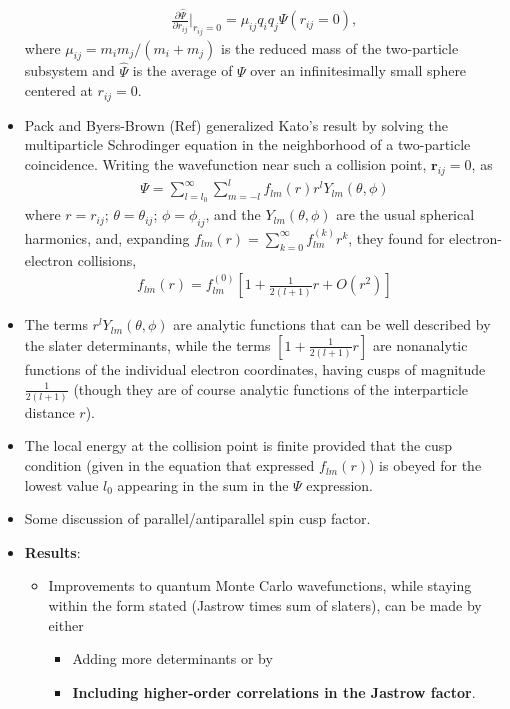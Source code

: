\documentclass[twoside,english]{uiofysmaster}
\begin{document}
\begin{itemize}
	\begin{align}
		\frac{ \partial \hat{\Psi} }{ \partial r_{ij} } |_{r_{ij}=0} = \mu_{ij} q_i q_j \Psi (r_{ij} = 0),
	\end{align}
	where $\mu_{ij} = m_i m_j/(m_i + m_j)$ is the reduced mass of the two-particle subsystem and $\hat{\Psi}$ is the average of $\Psi$ over an infinitesimally small sphere centered at $r_{ij} = 0$. 
	\item Pack and Byers-Brown (Ref) generalized Kato's result by solving the multiparticle Schrodinger equation in the neighborhood of a two-particle coincidence. Writing the wavefunction near such a collision point, $\bm{r}_{ij}=0$, as
	\begin{align}
		\Psi = \sum_{l=l_0}^\infty \sum_{m=-l}^l f_{lm} (r) r^l Y_{lm} (\theta, \phi)
	\end{align}
	where $r=r_{ij}$; $\theta=\theta_{ij}$; $\phi=\phi_{ij}$, and the $Y_{lm} (\theta, \phi)$ are the usual spherical harmonics, and, expanding $f_{lm}(r) = \sum_{k=0}^\infty f_{lm}^{(k)} r^k$, they found for electron-electron collisions,
	\begin{align}
		f_{lm} (r) = f_{lm}^{(0)} [ 1 + \frac{1}{2(l+1)}r + O(r^2) ]
	\end{align}
	\item The terms $r^l Y_{lm} (\theta, \phi)$ are analytic functions that can be well described by the slater determinants, while the terms $ [ 1 + \frac{1}{2(l+1)}r ]$ are nonanalytic functions of the individual electron coordinates, having cusps of magnitude $\frac{1}{2(l+1)}$ (though they are of course analytic functions of the interparticle distance $r$). 
	\item The local energy at the collision point is finite provided that the cusp condition (given in the equation that expressed $f_{lm}(r)$) is obeyed for the lowest value $l_0$ appearing in the sum in the $\Psi$ expression.
	\item Some discussion of parallel/antiparallel spin cusp factor.
	\item \textbf{Results}:
	\begin{itemize}
		\item Improvements to quantum Monte Carlo wavefunctions, while staying within the form stated (Jastrow times sum of slaters), can be made by either
		\begin{itemize}
			\item Adding more determinants or by
			\item \textbf{Including higher-order correlations in the Jastrow factor}.

\end{itemize}
\end{itemize}
\end{itemize}
\end{document}
